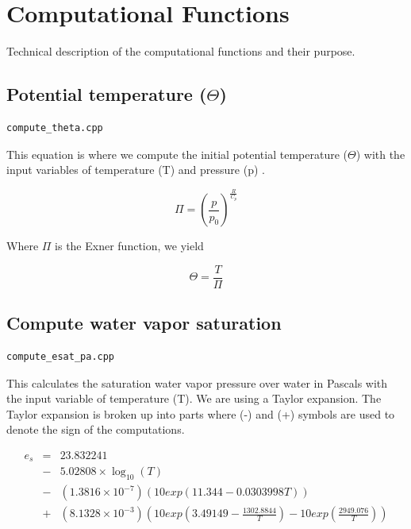 \documentclass{article}
\begin{document}
\newpage
\section{Computational Functions}\label{comp-functions}

Technical description of the computational functions and their purpose. 


\subsection{Potential temperature ($\Theta$)}
\begin{verbatim}
compute_theta.cpp
\end{verbatim}

This equation is where we compute the initial potential temperature ($\Theta$) with the input variables of temperature (T) and pressure (p) \cite{wallace}.

\begin{equation}
\Pi = \left(\frac{p}{p_{0}}\right)^{\frac{R}{C_{p}}}
\end{equation}

Where $\Pi$ is the Exner function, we yield \cite{krueger}

\begin{equation}
\Theta = \frac{T}{\Pi}
\end{equation}


\subsection{Compute water vapor saturation}
\begin{verbatim}
compute_esat_pa.cpp
\end{verbatim}

This calculates the saturation water vapor pressure over water in Pascals with the input variable of temperature (T). We are using a Taylor expansion. The Taylor expansion is broken up into parts where (-) and (+) symbols are used to denote the sign of the computations.

\begin{eqnarray}
e_{s} &=& 23.832241 \\
&-& 5.02808 \times \log_{10}\left(T\right) \nonumber \\
&-&\left(1.3816 \times 10^{-7}\right)\left(10exp\left(11.344 - 0.0303998T\right)\right) \nonumber \\
&+&\left(8.1328 \times 10^{-3}\right)\left(10exp\left(3.49149 - \frac{1302.8844}{T}\right) - 10exp\left(\frac{2949.076}{T}\right)\right) \nonumber
\end{eqnarray}
\end{document}
